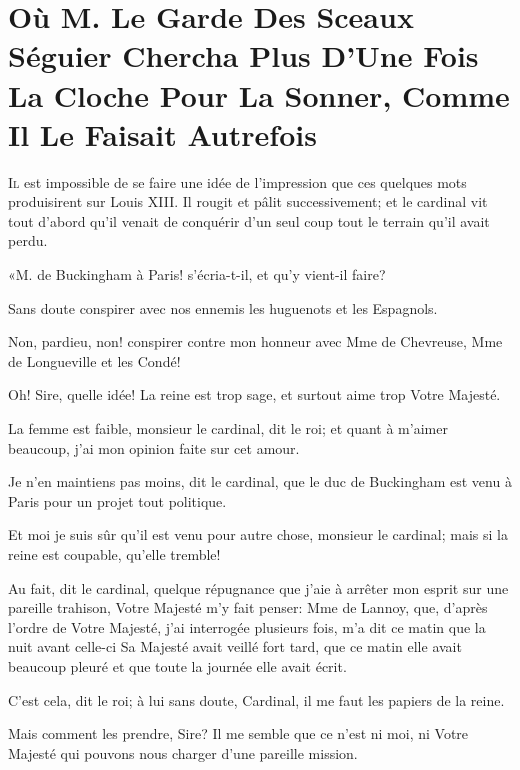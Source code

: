
\chapter[Où M. Séguier Chercha La Cloche]{Où M. Le Garde Des Sceaux Séguier Chercha Plus D'Une Fois La Cloche Pour La Sonner, Comme Il Le Faisait Autrefois}
	
	
\lettrine{I}{l} est impossible de se faire une idée de l'impression que ces quelques mots produisirent sur Louis XIII. Il rougit et pâlit successivement; et le cardinal vit tout d'abord qu'il venait de conquérir d'un seul coup tout le terrain qu'il avait perdu. 

«M. de Buckingham à Paris! s'écria-t-il, et qu'y vient-il faire? 

\speak  Sans doute conspirer avec nos ennemis les huguenots et les Espagnols. 

\speak  Non, pardieu, non! conspirer contre mon honneur avec Mme de Chevreuse, Mme de Longueville et les Condé! 

\speak  Oh! Sire, quelle idée! La reine est trop sage, et surtout aime trop Votre Majesté. 

\speak  La femme est faible, monsieur le cardinal, dit le roi; et quant à m'aimer beaucoup, j'ai mon opinion faite sur cet amour. 

\speak  Je n'en maintiens pas moins, dit le cardinal, que le duc de Buckingham est venu à Paris pour un projet tout politique. 

\speak  Et moi je suis sûr qu'il est venu pour autre chose, monsieur le cardinal; mais si la reine est coupable, qu'elle tremble! 

\speak  Au fait, dit le cardinal, quelque répugnance que j'aie à arrêter mon esprit sur une pareille trahison, Votre Majesté m'y fait penser: Mme de Lannoy, que, d'après l'ordre de Votre Majesté, j'ai interrogée plusieurs fois, m'a dit ce matin que la nuit avant celle-ci Sa Majesté avait veillé fort tard, que ce matin elle avait beaucoup pleuré et que toute la journée elle avait écrit. 

\speak  C'est cela, dit le roi; à lui sans doute, Cardinal, il me faut les papiers de la reine. 

\speak  Mais comment les prendre, Sire? Il me semble que ce n'est ni moi, ni Votre Majesté qui pouvons nous charger d'une pareille mission. 


